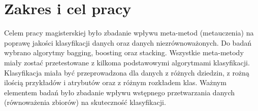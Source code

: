 \chapter*{Zakres i cel pracy}
Celem pracy magisterskiej było zbadanie wpływu meta-metod (metauczenia) na poprawę jakości klasyfikacji danych oraz danych niezrównoważonych. Do badań wybrano algorytmy bagging, boosting oraz stacking. Wszystkie meta-metody miały zostać przetestowane z kilkoma podstawowymi algorytmami klasyfikacji. Klasyfikacja miała być przeprowadzona dla danych z różnych dziedzin, z rożną ilością przykładów i atrybutów oraz z różnym rozkładem klas. Ważnym elementem badań było zbadanie wpływu wstępnego przetwarzania danych (równoważenia zbiorów) na skuteczność klasyfikacji. 